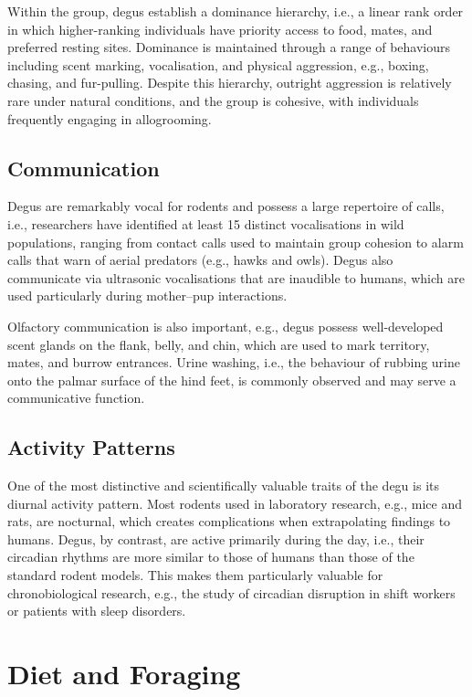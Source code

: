 \documentclass[12pt,a4paper]{article}
\begin{document}
Within the group, degus establish a dominance hierarchy, i.e., a linear rank order in which higher-ranking individuals have priority access to food, mates, and preferred resting sites.
Dominance is maintained through a range of behaviours including scent marking, vocalisation, and physical aggression, e.g., boxing, chasing, and fur-pulling.
Despite this hierarchy, outright aggression is relatively rare under natural conditions, and the group is cohesive, with individuals frequently engaging in allogrooming.

\subsection{Communication}

Degus are remarkably vocal for rodents and possess a large repertoire of calls, i.e., researchers have identified at least 15 distinct vocalisations in wild populations, ranging from contact calls used to maintain group cohesion to alarm calls that warn of aerial predators (e.g., hawks and owls).
Degus also communicate via ultrasonic vocalisations that are inaudible to humans, which are used particularly during mother--pup interactions.

Olfactory communication is also important, e.g., degus possess well-developed scent glands on the flank, belly, and chin, which are used to mark territory, mates, and burrow entrances.
Urine washing, i.e., the behaviour of rubbing urine onto the palmar surface of the hind feet, is commonly observed and may serve a communicative function.

\subsection{Activity Patterns}

One of the most distinctive and scientifically valuable traits of the degu is its diurnal activity pattern.
Most rodents used in laboratory research, e.g., mice and rats, are nocturnal, which creates complications when extrapolating findings to humans.
Degus, by contrast, are active primarily during the day, i.e., their circadian rhythms are more similar to those of humans than those of the standard rodent models.
This makes them particularly valuable for chronobiological research, e.g., the study of circadian disruption in shift workers or patients with sleep disorders.

\section{Diet and Foraging}
\end{document}
